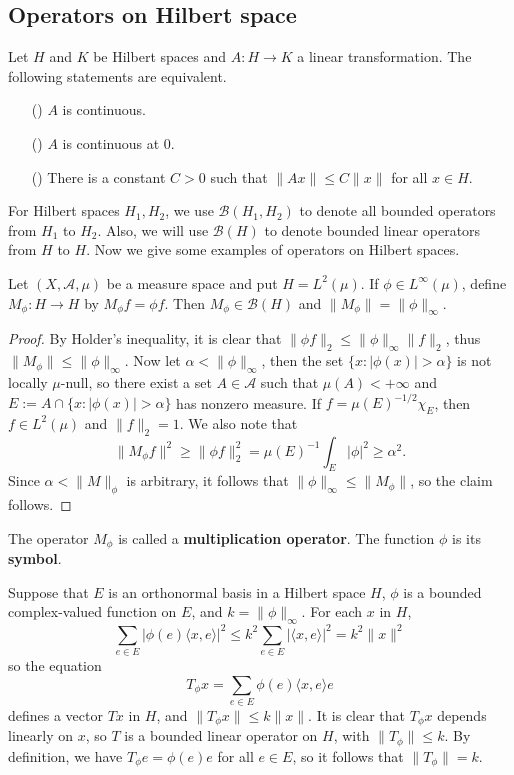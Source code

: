 \subsection{Operators on Hilbert space}
\begin{proposition}
Let $H$ and $K$ be Hilbert spaces and $A:H\to K$ a linear transformation. The following statements are equivalent.
\begin{itemize}
\item[(\rmnum{1})] $A$ is continuous.
\item[(\rmnum{2})] $A$ is continuous at $0$.
\item[(\rmnum{3})] There is a constant $C>0$ such that $\|Ax\|\leq C\|x\|$ for all $x\in H$. 
\end{itemize}
\end{proposition}
For Hilbert spaces $H_1,H_2$, we use $\mathcal{B}(H_1,H_2)$ to denote all bounded operators from $H_1$ to $H_2$. Also, we will use $\mathcal{B}(H)$ to denote bounded linear operators from $H$ to $H$. Now we give some examples of operators on Hilbert spaces.
\begin{proposition}\label{L^2 space multiplication map}
Let $(X,\mathcal{A},\mu)$ be a measure space and put $H=L^2(\mu)$. If $\phi\in L^\infty(\mu)$, define $M_\phi:H\to H$ by $M_\phi f=\phi f$. Then $M_\phi\in\mathcal{B}(H)$ and $\|M_\phi\|=\|\phi\|_\infty$.
\end{proposition}
\begin{proof}
By Holder's inequality, it is clear that $\|\phi f\|_2\leq\|\phi\|_\infty\|f\|_2$, thus $\|M_\phi\|\leq\|\phi\|_\infty$. Now let $\alpha<\|\phi\|_\infty$, then the set $\{x:|\phi(x)|>\alpha\}$ is not locally $\mu$-null, so there exist a set $A\in\mathcal{A}$ such that $\mu(A)<+\infty$ and $E:=A\cap\{x:|\phi(x)|>\alpha\}$ has nonzero measure. If $f=\mu(E)^{-1/2}\chi_E$, then $f\in L^2(\mu)$ and $\|f\|_2=1$. We also note that
\[\|M_\phi f\|^2\geq\|\phi f\|_2^2=\mu(E)^{-1}\int_E|\phi|^2\geq\alpha^2.\]
Since $\alpha<\|M\|_\phi$ is arbitrary, it follows that $\|\phi\|_\infty\leq\|M_\phi\|$, so the claim follows.
\end{proof}
The operator $M_\phi$ is called a \textbf{multiplication operator}. The function $\phi$ is its \textbf{symbol}.
\begin{example}\label{Hilbert space multiplication operator}
Suppose that $E$ is an orthonormal basis in a Hilbert space $H$, $\phi$ is a bounded complex-valued function on $E$, and $k=\|\phi\|_\infty$. For each $x$ in $H$,
\[\sum_{e\in E}|\phi(e)\langle x,e\rangle|^2\leq k^2\sum_{e\in E}|\langle x,e\rangle|^2=k^2\|x\|^2\]
so the equation
\[T_\phi x=\sum_{e\in E}\phi(e)\langle x,e\rangle e\]
defines a vector $Tx$ in $H$, and $\|T_\phi x\|\leq k\|x\|$. It is clear that $T_\phi x$ depends linearly on $x$, so $T$ is a bounded linear operator on $H$, with $\|T_\phi\|\leq k$. By definition, we have $T_\phi e=\phi(e)e$ for all $e\in E$, so it follows that $\|T_\phi\|=k$.
\end{example}
